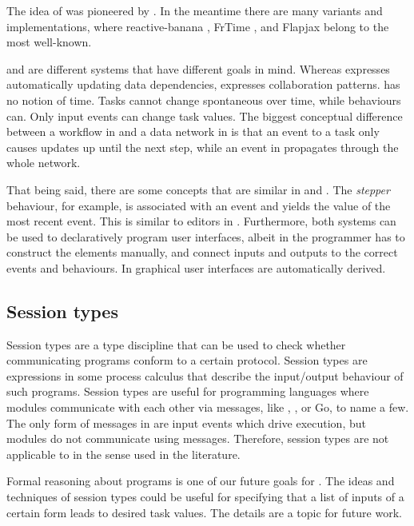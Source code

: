 The idea of \FRP was pioneered by \citet{conf/icfp/ElliottH97}.
In the meantime there are many variants and implementations, where reactive-banana \cite{reactive-banana}, FrTime \cite{CooperK04}, and Flapjax \cite{conf/oopsla/MeyerovichGBCGBK09} belong to the most well-known.

\FRP and \TOP are different systems that have different goals in mind.
Whereas \FRP expresses automatically updating data dependencies, \TOP expresses collaboration patterns.
\TOP has no notion of time.
Tasks cannot change spontaneous over time, while behaviours can.
Only input events can change task values.
The biggest conceptual difference between a workflow in \TOP and a data network in \FRP is that an event to a task only causes updates up until the next step, while an event in \FRP propagates through the whole network.

That being said, there are some concepts that are similar in \TOP and \FRP.
The \emph{stepper} behaviour, for example, is associated with an event and yields the value of the most recent event.
This is similar to editors in \TOP.
Furthermore, both systems can be used to declaratively program user interfaces, albeit in \FRP the programmer has to construct the \GUI elements manually, and connect inputs and outputs to the correct events and behaviours.
In \TOP graphical user interfaces are automatically derived.



\subsection{Session types}

Session types are a type discipline that can be used to check whether communicating programs conform to a certain protocol.
Session types are expressions in some process calculus that describe the input/output behaviour of such programs.
Session types are useful for programming languages where modules communicate with each other via messages, like \CSP, \PICALC, or Go, to name a few.
The only form of messages in \TOP are input events which drive execution, but modules do not communicate using messages.
Therefore, session types are not applicable to \TOP in the sense used in the literature.

Formal reasoning about \TOP programs is one of our future goals for \TOPHAT.
The ideas and techniques of session types could be useful for specifying that a list of inputs of a certain form leads to desired task values.
The details are a topic for future work.



